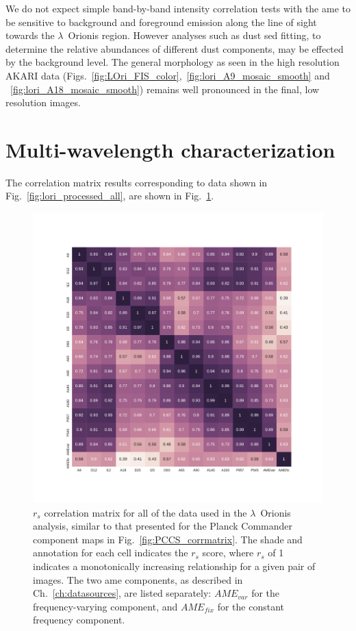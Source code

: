           We do not expect simple band-by-band intensity correlation tests with the \gls{ame} to be sensitive to background and foreground emission along the line of sight towards the $\lambda$~Orionis region. However analyses such as dust \gls{sed} fitting, to determine the relative abundances of different dust components, may be effected by the background level. The general morphology as seen in the high resolution AKARI data (Figs.~\ref{fig:LOri_FIS_color},~\ref{fig:lori_A9_mosaic_smooth} and ~\ref{fig:lori_A18_mosaic_smooth}) remains well pronounced in the final, low resolution images.

	\section{Multi-wavelength characterization}
    The correlation matrix results corresponding to data shown in Fig.~\ref{fig:lori_processed_all}, are shown in Fig.~\ref{fig:orionis-corr-matrix}.
      \begin{figure}
        \includegraphics[width=\textwidth]{../Plots/ch_lori/Lori_corrmatrix_I.pdf}
        \centering
        \caption{$r_{s}$ correlation matrix for all of the data used in the $\lambda$~Orionis analysis, similar to that presented for the Planck Commander component maps in Fig.~\ref{fig:PCCS_corrmatrix}. The shade and annotation for each cell indicates the $r_{s}$ score, where $r_{s}$ of 1 indicates a monotonically increasing relationship for a given pair of images. The two \gls{ame} components, as described in Ch.~\ref{ch:datasources}, are listed separately: $AME_{var}$ for the frequency-varying component, and $AME_{fix}$ for the constant frequency component.}
        \label{fig:orionis-corr-matrix}
      \end{figure}
